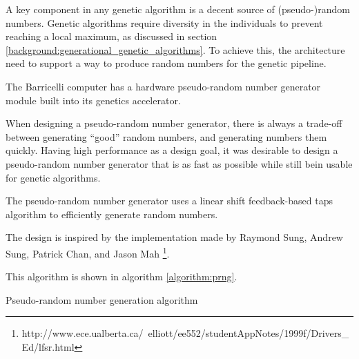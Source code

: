 A key component in any genetic algorithm is a decent source of (pseudo-)random numbers.
Genetic algorithms require diversity in the individuals to prevent reaching a local maximum, as discussed in section \ref{background:generational_genetic_algorithms}. 
To achieve this, the architecture need to support a way to produce random numbers for the genetic pipeline.   

The Barricelli computer has a hardware pseudo-random number generator module built into its genetics accelerator.

When designing a pseudo-random number generator, there is always a trade-off between generating ``good'' random numbers, and generating numbers them quickly.
Having high performance as a design goal\cn, it was desirable to design a pseudo-random number generator that is as fast as possible while still bein usable for genetic algorithms.

The pseudo-random number generator uses a linear shift feedback-based taps algorithm to efficiently generate random numbers.

The design is inspired by the implementation made by Raymond Sung, Andrew Sung, Patrick Chan, and Jason Mah \footnote{http://www.ece.ualberta.ca/~elliott/ee552/studentAppNotes/1999f/Drivers\_Ed/lfsr.html}. 

This algorithm is shown in algorithm \vref{algorithm:prng}.

\begin{algorithm}[H]
\SetAlgoLined
\DontPrintSemicolon
{}
\caption{Pseudo-random number generation algorithm}
\label{algorithm:prng}
\end{algorithm}


